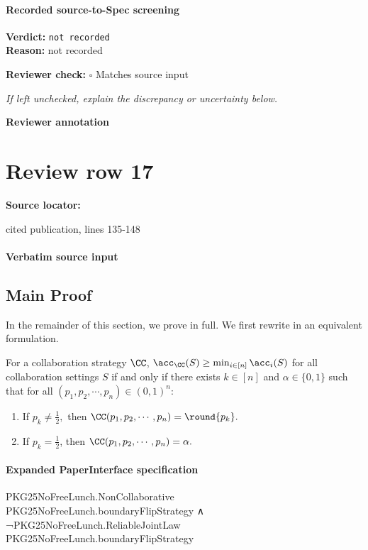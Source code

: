 \documentclass[10pt]{article}
\newcommand{\reviewerbox}{%
  \par\noindent\fbox{\parbox{0.96\linewidth}{\rule{0pt}{0.38in}}}\par
}
\newcommand{\reviewmatch}[1]{%
  \par\noindent\textbf{Reviewer check:} $\square$\; #1\par
  \noindent\emph{If left unchecked, explain the discrepancy or uncertainty below.}\par
}
\begin{document}
\paragraph{Recorded source-to-Spec screening}
\textbf{Verdict:} \texttt{not recorded}
\\
\textbf{Reason:} not recorded
\reviewmatch{Matches source input}
\noindent\textbf{Reviewer annotation}\par
\reviewerbox
\clearpage
\hypertarget{source-claim-1b69269ab69dfcc0}{}
\section*{Review row 17}
\textbf{Source locator:} {\footnotesize\raggedright cited publication, lines 135-\allowbreak{}148\par}
\paragraph{Verbatim source input}
\begin{ReviewVerbatim}
\subsection{Main Proof}
In the remainder of this section, we prove  in full. We first rewrite  in an equivalent formulation.

\setcounter{theorem}{0}
\begin{theorem}
For a collaboration strategy $\CC$, $\acc_\CC(S) \ge \min_{i\in [n]}\acc_i(S)$ for all collaboration settings $S$ if and only if there exists $k\in [n]$ and $\alpha \in \{0,1\}$ such that for all $(p_1,p_2,\cdots,p_n)\in (0,1)^n$:

\begin{enumerate}
    \item[(i)] If $p_k\neq \frac{1}{2},$ then
    $\CC(p_1,p_2,\cdots,p_n)=\round{p_k}.$
    \item[(ii)] If $p_k=\frac{1}{2}$, then
        $\CC(p_1,p_2,\cdots,p_n) = \alpha.$
\end{enumerate}
\end{theorem}
\end{ReviewVerbatim}


\paragraph{Expanded PaperInterface specification}
\begin{ReviewVerbatim}
PKG25NoFreeLunch.NonCollaborative PKG25NoFreeLunch.boundaryFlipStrategy ∧
  ¬PKG25NoFreeLunch.ReliableJointLaw PKG25NoFreeLunch.boundaryFlipStrategy
\end{ReviewVerbatim}
\end{document}
